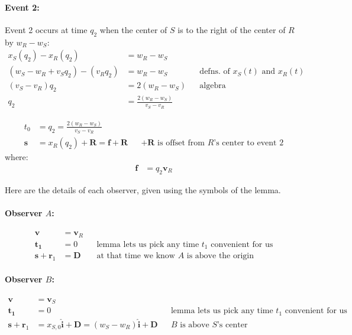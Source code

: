 \documentclass[a4paper]{article}
\theoremstyle{plain}
\theoremstyle{definition}
\newcommand{\vect}[1]{\mathbf{#1}}
\newcommand{\hatvec}[1]{\hat{\mathbf{#1}}}
\begin{document}
\paragraph{Event 2:}

Event 2 occurs at time $q_2$ when the center of $S$ is to the right of
the center of $R$ by $w_R - w_S$:
\begin{align}
x_S(q_2) - x_R(q_2) & = w_R - w_S \nonumber \\
(w_S - w_R + v_S q_2) - (v_R q_2) & = w_R - w_S & & \text{defns. of $x_S(t)$ and $x_R(t)$} \nonumber \\
(v_S - v_R) q_2 & = 2(w_R - w_S) & & \text{algebra} \nonumber \\
q_2 & = \frac{2(w_R - w_S)}{v_S - v_R} \label{eqn:scen3b-event2time}
\end{align}

\begin{align}
t_0 & = q_2 = \frac{2(w_R - w_S)}{v_S - v_R} \\
\vect{s} & = x_R(q_2) + \vect{R} = \vect{f} + \vect{R} & & \text{$+\vect{R}$ is offset from $R$'s center to event 2}
\end{align}
where:
\begin{align}
\vect{f} & = q_2 \vect{v}_R
\end{align}

Here are the details of each observer, given using the symbols of the
lemma.


\paragraph{Observer $A$:}

\begin{align}
\vect{v} & = \vect{v}_R \\
\vect{t_1} & = 0 & & \text{lemma lets us pick any time $t_1$ convenient for us} \\
\vect{s} + \vect{r}_1 & = \vect{D} & & \text{at that time we know $A$ is above the origin}
\end{align}


\paragraph{Observer $B$:}

\begin{align}
\vect{v} & = \vect{v}_S \\
\vect{t_1} & = 0 & & \text{lemma lets us pick any time $t_1$ convenient for us} \\
\vect{s} + \vect{r}_1 & = x_{S,0}\hatvec{i} + \vect{D} = (w_S - w_R)\hatvec{i} + \vect{D} & & \text{$B$ is above $S$'s center}
\end{align}
\end{document}

